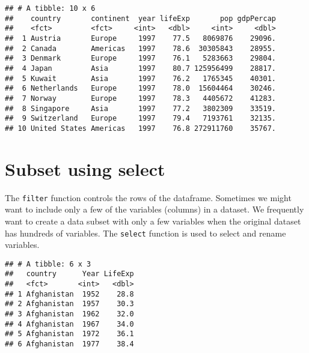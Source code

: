 \documentclass[
]{book}
\newenvironment{Shaded}{\begin{snugshade}}{\end{snugshade}}
\newcommand{\CommentTok}[1]{\textcolor[rgb]{0.56,0.35,0.01}{\textit{#1}}}
\newcommand{\DataTypeTok}[1]{\textcolor[rgb]{0.13,0.29,0.53}{#1}}
\newcommand{\KeywordTok}[1]{\textcolor[rgb]{0.13,0.29,0.53}{\textbf{#1}}}
\newcommand{\NormalTok}[1]{#1}
\newcommand{\OperatorTok}[1]{\textcolor[rgb]{0.81,0.36,0.00}{\textbf{#1}}}
\newcommand{\StringTok}[1]{\textcolor[rgb]{0.31,0.60,0.02}{#1}}
\begin{document}
\begin{verbatim}
## # A tibble: 10 x 6
##    country       continent  year lifeExp       pop gdpPercap
##    <fct>         <fct>     <int>   <dbl>     <int>     <dbl>
##  1 Austria       Europe     1997    77.5   8069876    29096.
##  2 Canada        Americas   1997    78.6  30305843    28955.
##  3 Denmark       Europe     1997    76.1   5283663    29804.
##  4 Japan         Asia       1997    80.7 125956499    28817.
##  5 Kuwait        Asia       1997    76.2   1765345    40301.
##  6 Netherlands   Europe     1997    78.0  15604464    30246.
##  7 Norway        Europe     1997    78.3   4405672    41283.
##  8 Singapore     Asia       1997    77.2   3802309    33519.
##  9 Switzerland   Europe     1997    79.4   7193761    32135.
## 10 United States Americas   1997    76.8 272911760    35767.
\end{verbatim}

\hypertarget{subset-using-select}{%
\section{Subset using select}\label{subset-using-select}}

The \texttt{filter} function controls the rows of the dataframe. Sometimes we might want to include only a few of the variables (columns) in a dataset. We frequently want to create a data subset with only a few variables when the original dataset has hundreds of variables. The \texttt{select} function is used to select and rename variables.

\begin{Shaded}
\end{Shaded}

\begin{verbatim}
## # A tibble: 6 x 3
##   country      Year LifeExp
##   <fct>       <int>   <dbl>
## 1 Afghanistan  1952    28.8
## 2 Afghanistan  1957    30.3
## 3 Afghanistan  1962    32.0
## 4 Afghanistan  1967    34.0
## 5 Afghanistan  1972    36.1
## 6 Afghanistan  1977    38.4
\end{verbatim}
\end{document}

